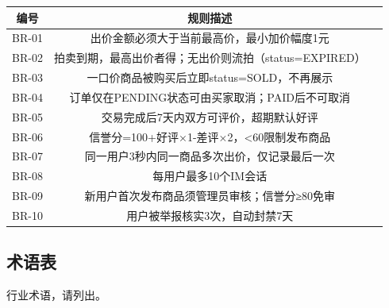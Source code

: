 \documentclass[12pt,a4paper]{ctexart}
\numberwithin{figure}{section}
\numberwithin{table}{section}
\begin{document}
\begin{center}
\renewcommand{\arraystretch}{1.3}
\begin{tabular}{|c|c|p{10cm}|}
\hline
\rowcolor{tableheader}
\textbf{编号} & \textbf{规则描述} \\
\hline
BR-01 & 出价金额必须大于当前最高价，最小加价幅度1元 \\
\hline
BR-02 & 拍卖到期，最高出价者得；无出价则流拍（status=EXPIRED） \\
\hline
BR-03 & 一口价商品被购买后立即status=SOLD，不再展示 \\
\hline
BR-04 & 订单仅在PENDING状态可由买家取消；PAID后不可取消 \\
\hline
BR-05 & 交易完成后7天内双方可评价，超期默认好评 \\
\hline
BR-06 & 信誉分=100+好评×1-差评×2，<60限制发布商品 \\
\hline
BR-07 & 同一用户3秒内同一商品多次出价，仅记录最后一次 \\
\hline
BR-08 & 每用户最多10个IM会话 \\
\hline
BR-09 & 新用户首次发布商品须管理员审核；信誉分≥80免审 \\
\hline
BR-10 & 用户被举报核实3次，自动封禁7天 \\
\hline
\end{tabular}
\end{center}

\subsection{术语表}

行业术语，请列出。
\end{document}
